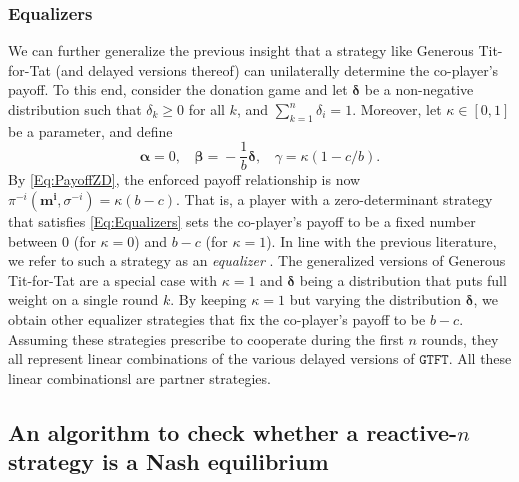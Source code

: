 \documentclass[9pt,twoside,lineno]{pnas-new}
\theoremstyle{plainCl1}
\theoremstyle{plainCl2}
\def\gtft{\texttt{GTFT}}
\begin{document}
\subsubsection*{Equalizers} We can further generalize the previous insight that a strategy like Generous Tit-for-Tat (and delayed versions thereof) can unilaterally determine the co-player's payoff. To this end, consider the donation game and let $\boldsymbol \delta$ be a non-negative distribution such that $\delta_k\!\ge\!0$ for all $k$, and $\sum_{k=1}^n \delta_i\!=\!1$. Moreover, let $\kappa\!\in\![0,1]$ be a parameter, and define
\begin{equation} \label{Eq:Equalizers}
\boldsymbol \alpha \!=\!0,~~~~
\boldsymbol \beta \!=\! -\frac{1}{b} \boldsymbol \delta,~~~~
\gamma \!=\! \kappa (1\!-\!c/b). 
\end{equation}
By \eqref{Eq:PayoffZD}, the enforced payoff relationship is now $\pi^{-i}(\mathbf{m^{i}}, \sigma^{-i})\!=\!\kappa(b\!-\!c)$. 
That is, a player with a zero-determinant strategy that satisfies \eqref{Eq:Equalizers} sets the co-player's payoff to be a fixed number between 0 (for $\kappa\!=\!0$) and $b\!-\!c$ (for $\kappa\!=\!1$). 
In line with the previous literature, we refer to such a strategy as an {\it equalizer} \citep{boerlijst:AMM:1997,press:PNAS:2012}. 
The generalized versions of Generous Tit-for-Tat are a special case with $\kappa\!=\!1$ and $\boldsymbol{\delta}$ being a distribution that puts full weight on a single round $k$. 
By keeping $\kappa\!=\!1$ but varying the distribution $\boldsymbol \delta$, we obtain other equalizer strategies that fix the co-player's payoff to be $b\!-\!c$. 
Assuming these strategies prescribe to cooperate during the first $n$ rounds, they all represent linear combinations of the various delayed versions of $\gtft$. All these linear combinationsl are partner strategies. 


\subsection{An algorithm to check whether a reactive-$n$ strategy is a Nash equilibrium}
\label{Sec:Algorithm}

\end{document}
